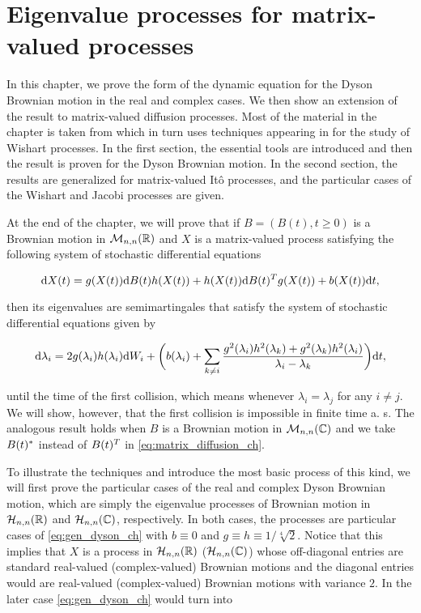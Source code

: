 \chapter{Eigenvalue processes for matrix-valued processes}  \label{ch:eigen_processes}

In this chapter, we prove the form of the dynamic equation for the Dyson Brownian motion in the real and complex cases. We then show an extension of the result to matrix-valued diffusion processes. Most of the material in the chapter is taken from \cite{article:multiyamada} which in turn uses techniques appearing in \cite{bru1989diffusions} for the study of Wishart processes. In the first section, the essential tools are introduced and then the result is proven for the Dyson Brownian motion. In the second section, the results are generalized for matrix-valued Itô processes, and the particular cases of the Wishart and Jacobi processes are given.

At the end of the chapter, we will prove that if $B=(B(t), t\ge 0)$ is a Brownian motion in $\mathcal M_{n,n}(\mathbb R)$ and $X$ is a matrix-valued process satisfying the following system of stochastic differential equations

\begin{equation}
        \mathrm d X(t) = g(X(t)) \mathrm d B(t) h(X(t)) + h(X(t)) \mathrm d B(t)^T g(X(t)) + b(X(t))\mathrm d t, \label{eq:matrix_diffusion_ch}
\end{equation}

\noindent then its eigenvalues are semimartingales that satisfy the system of stochastic differential equations given by

    \begin{equation}
        \mathrm d \lambda_i = 2g(\lambda_i)h(\lambda_i)\mathrm d W_i + \biggl( b(\lambda_i) + \sum_{k\neq i} \frac{g^2(\lambda_i)h^2(\lambda_k) + g^2(\lambda_k)h^2(\lambda_i)}{\lambda_i - \lambda_k} \biggr)\mathrm d t, \label{eq:gen_dyson_ch}
    \end{equation}

\noindent until the time of the first collision, which means whenever $\lambda_i = \lambda_j$ for any $i\neq j$. We will show, however, that the first collision is impossible in finite time a. s.  The analogous result holds when $B$ is a Brownian motion in $\mathcal M_{n,n}(\mathbb C)$ and we take $B(t)^*$ instead of $B(t)^T$ in \eqref{eq:matrix_diffusion_ch}.

To illustrate the techniques and introduce the most basic process of this kind, we will first prove the particular cases of the real and complex Dyson Brownian motion, which are simply the eigenvalue processes of Brownian motion in $\mathcal H_{n,n}(\mathbb R)$ and $\mathcal H_{n,n}(\mathbb C)$, respectively. In both cases, the processes are particular cases of \eqref{eq:gen_dyson_ch} with $b\equiv 0$ and $g \equiv h \equiv 1/\sqrt[4]{2}$. Notice that this implies that $X$ is a process in $\mathcal H_{n,n}(\mathbb R)$  ($\mathcal H_{n,n}(\mathbb C)$) whose off-diagonal entries are standard real-valued (complex-valued) Brownian motions and the diagonal entries would are real-valued (complex-valued) Brownian motions with variance $2$. In the later case \eqref{eq:gen_dyson_ch} would turn into

